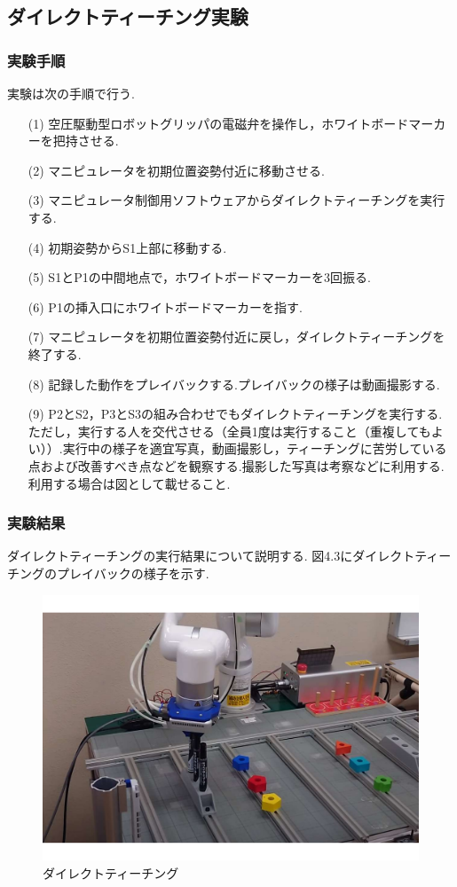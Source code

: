 \subsection{ダイレクトティーチング実験}

\subsubsection{実験手順}
実験は次の手順で行う.

\begin{enumerate}
  \item[(1)] 空圧駆動型ロボットグリッパの電磁弁を操作し，ホワイトボードマーカーを把持させる.
  \item[(2)] マニピュレータを初期位置姿勢付近に移動させる.
  \item[(3)] マニピュレータ制御用ソフトウェアからダイレクトティーチングを実行する.
  \item[(4)] 初期姿勢からS1上部に移動する.
  \item[(5)] S1とP1の中間地点で，ホワイトボードマーカーを3回振る.
  \item[(6)] P1の挿入口にホワイトボードマーカーを指す.
  \item[(7)] マニピュレータを初期位置姿勢付近に戻し，ダイレクトティーチングを終了する.
  \item[(8)] 記録した動作をプレイバックする.プレイバックの様子は動画撮影する.
  \item[(9)] P2とS2，P3とS3の組み合わせでもダイレクトティーチングを実行する.ただし，実行する人を交代させる（全員1度は実行すること（重複してもよい））.実行中の様子を適宜写真，動画撮影し，ティーチングに苦労している点および改善すべき点などを観察する.撮影した写真は考察などに利用する.利用する場合は図として載せること.
\end{enumerate}

\subsubsection{実験結果}
ダイレクトティーチングの実行結果について説明する.
図4.3にダイレクトティーチングのプレイバックの様子を示す.

\begin{figure}[h]
  \centering
  \includegraphics[scale=0.3]{sozai/4.pdf}
  \caption{ダイレクトティーチング}
\end{figure}

